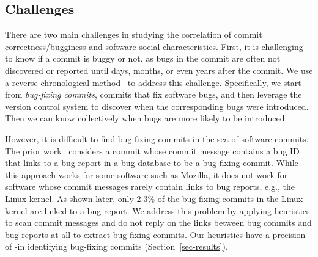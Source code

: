 \subsection{Challenges}
There are two main challenges in studying the correlation of commit correctness/bugginess and software social characteristics.
First, it is challenging to know if a commit is buggy or not,
as bugs in the commit are often not 
discovered or reported until days, months, or even years after the commit. 
We use a reverse chronological method~\cite{sliwerski-msr-2005} to address this challenge. 
Specifically, we start from {\em bug-fixing commits}, commits that fix software bugs, 
and then leverage the version control system to discover when the corresponding bugs were introduced. 
Then we can know collectively when bugs are more likely to be introduced. 

However, it is difficult to find bug-fixing commits in the sea of software commits.
The prior work~\cite{sliwerski-msr-2005} considers a commit whose commit message contains a bug 
ID that links to a bug report in a bug database to be a bug-fixing commit. While this
approach works for some software such as Mozilla, it does not work for software whose commit messages
rarely contain links to bug reports, e.g., the Linux kernel.
As shown later, only 2.3\% of the bug-fixing commits in the Linux kernel are linked to a bug report.
We address this problem by applying heuristics 
to scan commit messages and do not reply on the links between bug commits and bug reports at all to extract bug-fixing commits.
Our heuristics have a precision of \postP-\linuxP in identifying bug-fixing commits (Section~\ref{sec-results}).


